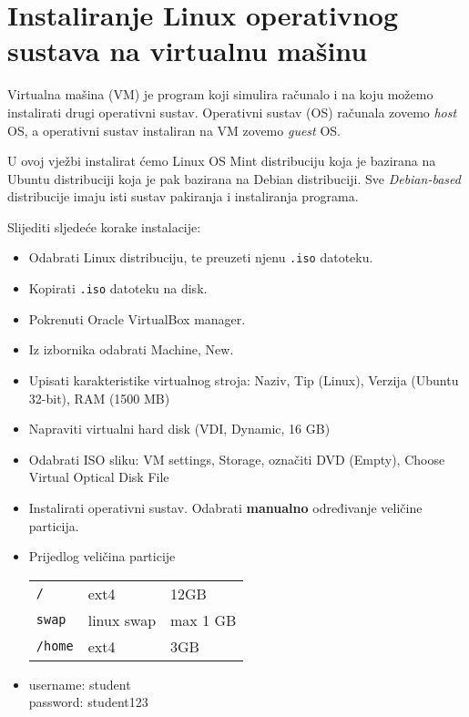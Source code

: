 

\section{Instaliranje Linux operativnog sustava na virtualnu mašinu}
Virtualna mašina (VM) je program koji simulira računalo i na koju možemo instalirati drugi operativni sustav. Operativni sustav (OS) računala zovemo \textit{host} OS, a operativni sustav instaliran na VM zovemo \textit{guest} OS.

U ovoj vježbi instalirat ćemo Linux OS Mint distribuciju koja je bazirana na Ubuntu distribuciji koja je pak bazirana na Debian distribuciji. Sve \textit{Debian-based} distribucije imaju isti sustav pakiranja i instaliranja programa.

\begin{zadatak} Slijediti sljedeće korake instalacije:
\begin{itemize}
\item Odabrati Linux distribuciju, te preuzeti njenu \texttt{.iso} datoteku.
\item Kopirati \texttt{.iso} datoteku na disk.
\item  Pokrenuti Oracle VirtualBox manager.
\item Iz izbornika odabrati Machine, New.
\item Upisati karakteristike virtualnog stroja: Naziv, Tip (Linux), Verzija (Ubuntu 32-bit), RAM (1500 MB)
\item Napraviti virtualni hard disk (VDI, Dynamic, 16 GB)
\item Odabrati ISO sliku: VM settings, Storage, označiti DVD (Empty), Choose Virtual Optical Disk File
\item Instalirati operativni sustav. Odabrati \textbf{manualno} određivanje veličine particija.
    
\item Prijedlog veličina particije 

\begin{tabular}{lll}
 \texttt{/} & ext4 & 12GB \\
 \texttt{swap} & linux swap & max 1 GB\\
 \texttt{/home} & ext4 & 3GB 
 \end{tabular}
\item username: student\\
      password: student123  
\end{itemize}
\end{zadatak}
 
